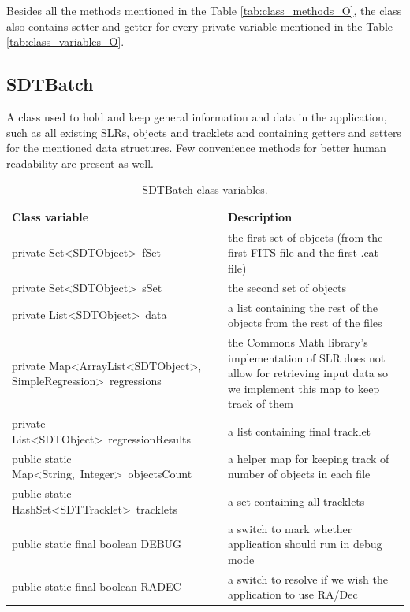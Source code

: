 	Besides all the methods mentioned in the Table \ref{tab:class_methods_O}, the class also contains setter and getter for every private variable mentioned in the Table \ref{tab:class_variables_O}.
	
\newpage

\subsection{SDTBatch}\label{subsec:batch}

	A class used to hold and keep general information and data in the application, such as all existing SLRs, objects and tracklets and containing getters and setters for the mentioned data structures. Few convenience methods for better human readability are present as well.
	
\begin{table}[H]
\centering
\setlength{\extrarowheight}{2pt}
\begin{tabularx}{\textwidth}{|X|X|}
\hline
\textbf{Class variable} & \textbf{Description} \\ \hline
private \mbox{Set<SDTObject> fSet} & the first set of objects (from the first FITS file and the first .cat file) \\ \hline
private \mbox{Set<SDTObject> sSet} & the second set of objects \\ \hline
private \mbox{List<SDTObject> data} & a list containing the rest of the objects from the rest of the files \\ \hline
private \mbox{Map<ArrayList<SDTObject>,} \mbox{SimpleRegression> regressions} & the Commons Math library's implementation of SLR does not allow for retrieving input data so we implement this map to keep track of them \\ \hline
private \mbox{List<SDTObject> regressionResults} & a list containing final tracklet \\ \hline
public static \mbox{Map<String, Integer> objectsCount} & a helper map for keeping track of number of objects in each file \\ \hline
public static \mbox{HashSet<SDTTracklet> tracklets} & a set containing all tracklets \\ \hline
public static final boolean \mbox{DEBUG} & a switch to mark whether application should run in debug mode \\ \hline
public static final boolean \mbox{RADEC} & a switch to resolve if we wish the application to use RA/Dec \\ \hline
\end{tabularx}
\caption{SDTBatch class variables.}
\label{tab:class_variables_B}
\end{table}

